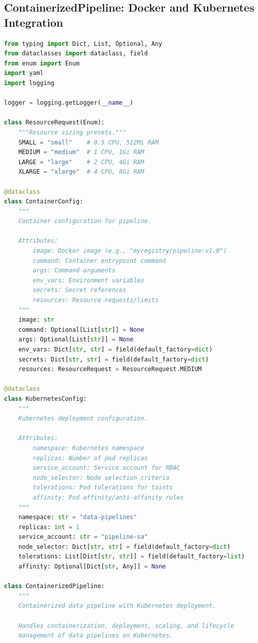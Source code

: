 \subsection{ContainerizedPipeline: Docker and Kubernetes Integration}

\begin{lstlisting}[language=Python, caption={Containerized Pipeline with Kubernetes Deployment}]
from typing import Dict, List, Optional, Any
from dataclasses import dataclass, field
from enum import Enum
import yaml
import logging

logger = logging.getLogger(__name__)

class ResourceRequest(Enum):
    """Resource sizing presets."""
    SMALL = "small"    # 0.5 CPU, 512Mi RAM
    MEDIUM = "medium"  # 1 CPU, 1Gi RAM
    LARGE = "large"    # 2 CPU, 4Gi RAM
    XLARGE = "xlarge"  # 4 CPU, 8Gi RAM

@dataclass
class ContainerConfig:
    """
    Container configuration for pipeline.

    Attributes:
        image: Docker image (e.g., "myregistry/pipeline:v1.0")
        command: Container entrypoint command
        args: Command arguments
        env_vars: Environment variables
        secrets: Secret references
        resources: Resource requests/limits
    """
    image: str
    command: Optional[List[str]] = None
    args: Optional[List[str]] = None
    env_vars: Dict[str, str] = field(default_factory=dict)
    secrets: Dict[str, str] = field(default_factory=dict)
    resources: ResourceRequest = ResourceRequest.MEDIUM

@dataclass
class KubernetesConfig:
    """
    Kubernetes deployment configuration.

    Attributes:
        namespace: Kubernetes namespace
        replicas: Number of pod replicas
        service_account: Service account for RBAC
        node_selector: Node selection criteria
        tolerations: Pod tolerations for taints
        affinity: Pod affinity/anti-affinity rules
    """
    namespace: str = "data-pipelines"
    replicas: int = 1
    service_account: str = "pipeline-sa"
    node_selector: Dict[str, str] = field(default_factory=dict)
    tolerations: List[Dict[str, str]] = field(default_factory=list)
    affinity: Optional[Dict[str, Any]] = None

class ContainerizedPipeline:
    """
    Containerized data pipeline with Kubernetes deployment.

    Handles containerization, deployment, scaling, and lifecycle
    management of data pipelines on Kubernetes.


\end{lstlisting}
